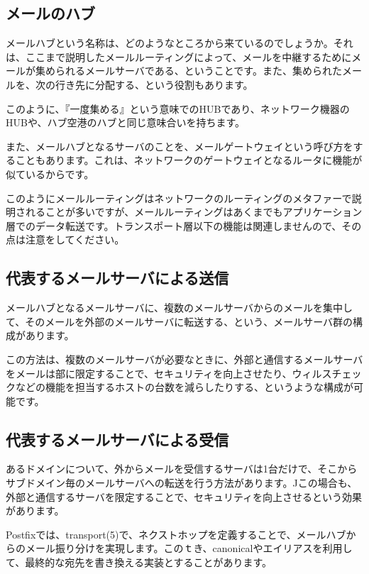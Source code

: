 \subsection{メールのハブ}

メールハブという名称は、どのようなところから来ているのでしょうか。それは、ここまで説明したメールルーティングによって、メールを中継するためにメールが集められるメールサーバである、ということです。また、集められたメールを、次の行き先に分配する、という役割もあります。

このように、『一度集める』という意味でのHUBであり、ネットワーク機器のHUBや、ハブ空港のハブと同じ意味合いを持ちます。

また、メールハブとなるサーバのことを、メールゲートウェイという呼び方をすることもあります。これは、ネットワークのゲートウェイとなるルータに機能が似ているからです。

このようにメールルーティングはネットワークのルーティングのメタファーで説明されることが多いですが、メールルーティングはあくまでもアプリケーション層でのデータ転送です。トランスポート層以下の機能は関連しませんので、その点は注意をしてください。

\subsection{代表するメールサーバによる送信}

メールハブとなるメールサーバに、複数のメールサーバからのメールを集中して、そのメールを外部のメールサーバに転送する、という、メールサーバ群の構成があります。

この方法は、複数のメールサーバが必要なときに、外部と通信するメールサーバをメールは部に限定することで、セキュリティを向上させたり、ウィルスチェックなどの機能を担当するホストの台数を減らしたりする、というような構成が可能です。




\subsection{代表するメールサーバによる受信}

あるドメインについて、外からメールを受信するサーバは1台だけで、そこからサブドメイン毎のメールサーバへの転送を行う方法があります。Jこの場合も、外部と通信するサーバを限定することで、セキュリティを向上させるという効果があります。

Postfixでは、transport(5)で、ネクストホップを定義することで、メールハブからのメール振り分けを実現します。このｔき、canonicalやエイリアスを利用して、最終的な宛先を書き換える実装とすることがあります。